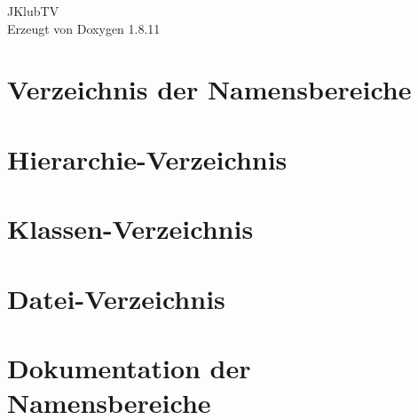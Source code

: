 \documentclass[twoside]{book}
\newcommand{\+}{\discretionary{\mbox{\scriptsize$\hookleftarrow$}}{}{}}
\newcommand{\clearemptydoublepage}{%
  \newpage{\pagestyle{empty}\cleardoublepage}%
}
\begin{document}
\hypersetup{pageanchor=false,
             bookmarksnumbered=true,
             pdfencoding=unicode
            }
\begin{titlepage}
\vspace*{7cm}
\begin{center}%
{\Large J\+Klub\+TV }\\
\vspace*{1cm}
{\large Erzeugt von Doxygen 1.8.11}\\
\end{center}
\end{titlepage}
\clearemptydoublepage
\tableofcontents
\clearemptydoublepage
{}
\hypersetup{pageanchor=true}

\chapter{Verzeichnis der Namensbereiche}

\chapter{Hierarchie-\/\+Verzeichnis}

\chapter{Klassen-\/\+Verzeichnis}

\chapter{Datei-\/\+Verzeichnis}

\chapter{Dokumentation der Namensbereiche}








\end{document}
